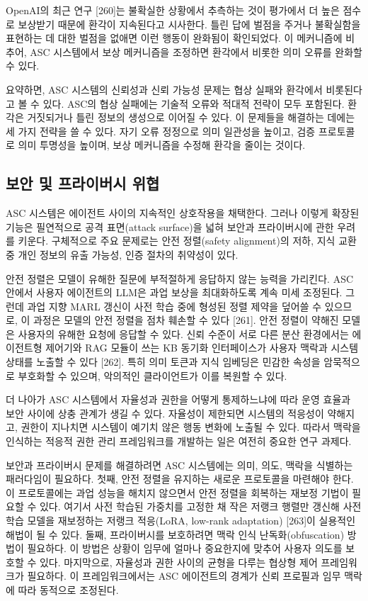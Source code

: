 OpenAI의 최근 연구 [260]는 불확실한 상황에서 추측하는 것이 평가에서 더 높은 점수로 보상받기 때문에 환각이 지속된다고 시사한다. 틀린 답에 벌점을 주거나 불확실함을 표현하는 데 대한 벌점을 없애면 이런 행동이 완화됨이 확인되었다. 이 메커니즘에 비추어, ASC 시스템에서 보상 메커니즘을 조정하면 환각에서 비롯한 의미 오류를 완화할 수 있다.

요약하면, ASC 시스템의 신뢰성과 신뢰 가능성 문제는 협상 실패와 환각에서 비롯된다고 볼 수 있다. ASC의 협상 실패에는 기술적 오류와 적대적 전략이 모두 포함된다. 환각은 거짓되거나 틀린 정보의 생성으로 이어질 수 있다. 이 문제들을 해결하는 데에는 세 가지 전략을 쓸 수 있다. 자기 오류 정정으로 의미 일관성을 높이고, 검증 프로토콜로 의미 투명성을 높이며, 보상 메커니즘을 수정해 환각을 줄이는 것이다.

\subsection{보안 및 프라이버시 위협}

ASC 시스템은 에이전트 사이의 지속적인 상호작용을 채택한다. 그러나 이렇게 확장된 기능은 필연적으로 공격 표면(attack surface)을 넓혀 보안과 프라이버시에 관한 우려를 키운다. 구체적으로 주요 문제로는 안전 정렬(safety alignment)의 저하, 지식 교환 중 개인 정보의 유출 가능성, 인증 절차의 취약성이 있다.

안전 정렬은 모델이 유해한 질문에 부적절하게 응답하지 않는 능력을 가리킨다. ASC 안에서 사용자 에이전트의 LLM은 과업 보상을 최대화하도록 계속 미세 조정된다. 그런데 과업 지향 MARL 갱신이 사전 학습 중에 형성된 정렬 제약을 덮어쓸 수 있으므로, 이 과정은 모델의 안전 정렬을 점차 훼손할 수 있다 [261]. 안전 정렬이 약해진 모델은 사용자의 유해한 요청에 응답할 수 있다. 신뢰 수준이 서로 다른 분산 환경에서는 에이전트형 제어기와 RAG 모듈이 쓰는 KB 동기화 인터페이스가 사용자 맥락과 시스템 상태를 노출할 수 있다 [262]. 특히 의미 토큰과 지식 임베딩은 민감한 속성을 암묵적으로 부호화할 수 있으며, 악의적인 클라이언트가 이를 복원할 수 있다.

더 나아가 ASC 시스템에서 자율성과 권한을 어떻게 통제하느냐에 따라 운영 효율과 보안 사이에 상충 관계가 생길 수 있다. 자율성이 제한되면 시스템의 적응성이 약해지고, 권한이 지나치면 시스템이 예기치 않은 행동 변화에 노출될 수 있다. 따라서 맥락을 인식하는 적응적 권한 관리 프레임워크를 개발하는 일은 여전히 중요한 연구 과제다.

보안과 프라이버시 문제를 해결하려면 ASC 시스템에는 의미, 의도, 맥락을 식별하는 패러다임이 필요하다. 첫째, 안전 정렬을 유지하는 새로운 프로토콜을 마련해야 한다. 이 프로토콜에는 과업 성능을 해치지 않으면서 안전 정렬을 회복하는 재보정 기법이 필요할 수 있다. 여기서 사전 학습된 가중치를 고정한 채 작은 저랭크 행렬만 갱신해 사전 학습 모델을 재보정하는 저랭크 적응(LoRA, low-rank adaptation) [263]이 실용적인 해법이 될 수 있다. 둘째, 프라이버시를 보호하려면 맥락 인식 난독화(obfuscation) 방법이 필요하다. 이 방법은 상황이 임무에 얼마나 중요한지에 맞추어 사용자 의도를 보호할 수 있다. 마지막으로, 자율성과 권한 사이의 균형을 다루는 협상형 제어 프레임워크가 필요하다. 이 프레임워크에서는 ASC 에이전트의 경계가 신뢰 프로필과 임무 맥락에 따라 동적으로 조정된다.

